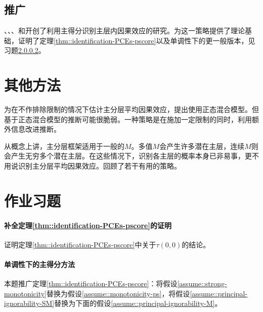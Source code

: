               
    
\subsection{推广}

 
 
 
 \citet{follmann2000effect}、\citet{hill2002differential}、\citet{jo2009use}、\citet{jo2011use}和\citet{stuart2015assessing}开创了利用主得分识别主层内因果效应的研究。\citet{ding2017principal}为这一策略提供了理论基础，证明了定理\ref{thm::identification-PCEs-pscore}以及单调性下的更一般版本，见习题\ref{para::prinpscore-mono}。  

 

\section{其他方法}


为在不作排除限制的情况下估计主分层平均因果效应，\citet{zhang2009likelihood}提出使用正态混合模型。但基于正态混合模型的推断可能很脆弱。一种策略是在施加一定限制的同时，利用额外信息改进推断\citep{ding2011identifiability, mealli2013using, mattei2013exploiting, jiang2016principal}。  
 
 
从概念上讲，主分层框架适用于一般的$M$。多值$M$会产生许多潜在主层，连续$M$则会产生无穷多个潜在主层。在这些情况下，识别各主层的概率本身已非易事，更不用说识别主分层平均因果效应。\citet{jiang2020identification}回顾了若干有用的策略。 
 


\section{作业习题}


\paragraph{补全定理\ref{thm::identification-PCEs-pscore}的证明}\label{hw::proof-part2-identification-PCEs}

证明定理\ref{thm::identification-PCEs-pscore}中关于$\tau(0,0) $的结论。 


 
\paragraph{单调性下的主得分方法}\label{para::prinpscore-mono}



本题推广定理\ref{thm::identification-PCEs-pscore}：将假设\ref{assume::strong-monotonicity}替换为假设\ref{assume::monotonicity-ps}，将假设\ref{assume::principal-ignorability-SM}替换为下面的假设\ref{assume::principal-ignorability-M}。 

